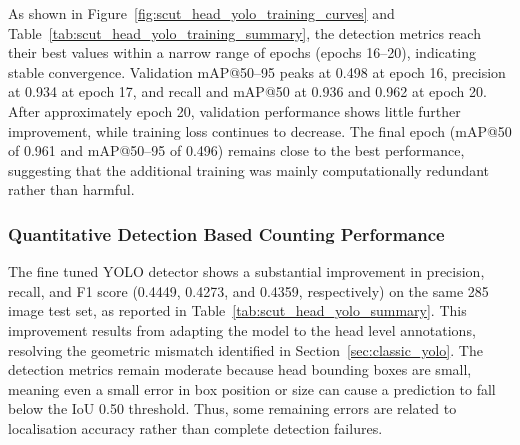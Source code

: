 \documentclass[12pt,a4paper]{report}
\begin{document}
As shown in Figure~\ref{fig:scut_head_yolo_training_curves} and Table~\ref{tab:scut_head_yolo_training_summary}, the detection metrics reach their best values within a narrow range of epochs (epochs 16--20), indicating stable convergence. Validation mAP@50--95 peaks at 0.498 at epoch 16, precision at 0.934 at epoch 17, and recall and mAP@50 at 0.936 and 0.962 at epoch 20. After approximately epoch 20, validation performance shows little further improvement, while training loss continues to decrease. The final epoch (mAP@50 of 0.961 and mAP@50--95 of 0.496) remains close to the best performance, suggesting that the additional training was mainly computationally redundant rather than harmful.

\subsubsection{Quantitative Detection Based Counting Performance}

The fine tuned YOLO detector shows a substantial improvement in precision, recall, and F1 score (0.4449, 0.4273, and 0.4359, respectively) on the same 285 image test set, as reported in Table~\ref{tab:scut_head_yolo_summary}. This improvement results from adapting the model to the head level annotations, resolving the geometric mismatch identified in Section~\ref{sec:classic_yolo}. The detection metrics remain moderate because head bounding boxes are small, meaning even a small error in box position or size can cause a prediction to fall below the IoU 0.50 threshold. Thus, some remaining errors are related to localisation accuracy rather than complete detection failures.
\end{document}
